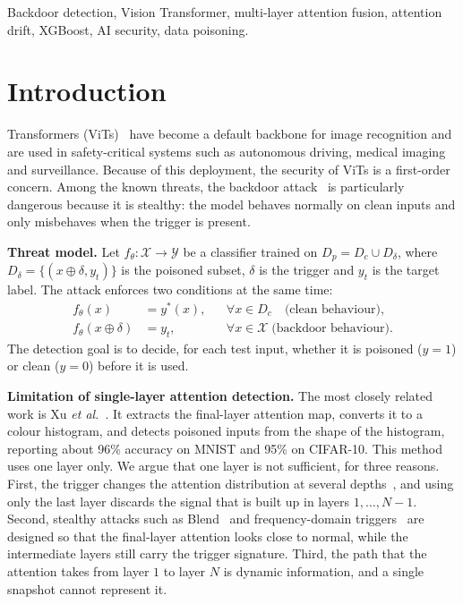 \documentclass[journal]{IEEEtran}
\begin{document}
\begin{IEEEkeywords}
Backdoor detection, Vision Transformer, multi-layer attention fusion, attention
drift, XGBoost, AI security, data poisoning.
\end{IEEEkeywords}

\section{Introduction}

 Transformers (ViTs)~\cite{dosovitskiy2020vit} have
become a default backbone for image recognition and are used in
safety-critical systems such as autonomous driving, medical imaging and
surveillance. Because of this deployment, the security of ViTs is a first-order
concern. Among the known threats, the backdoor attack~\cite{gu2017badnets} is
particularly dangerous because it is stealthy: the model behaves normally on
clean inputs and only misbehaves when the trigger is present.

\textbf{Threat model.} Let $f_\theta:\mathcal{X}\to\mathcal{Y}$ be a classifier
trained on $D_p=D_c\cup D_\delta$, where $D_\delta=\{(x\oplus\delta,y_t)\}$ is
the poisoned subset, $\delta$ is the trigger and $y_t$ is the target label. The
attack enforces two conditions at the same time:
\begin{align}
f_\theta(x)&=y^\ast(x), && \forall x\in D_c \quad\text{(clean behaviour)},\\
f_\theta(x\oplus\delta)&=y_t, && \forall x\in\mathcal{X}\;\text{(backdoor behaviour)}.
\end{align}
The detection goal is to decide, for each test input, whether it is poisoned
($y=1$) or clean ($y=0$) before it is used.

\textbf{Limitation of single-layer attention detection.} The most closely
related work is Xu \emph{et al.}~\cite{xu2025attention}. It extracts the
final-layer attention map, converts it to a colour histogram, and detects
poisoned inputs from the shape of the histogram, reporting about 96\% accuracy
on MNIST and 95\% on CIFAR-10. This method uses one layer only. We argue that
one layer is not sufficient, for three reasons. First, the trigger changes the
attention distribution at several depths~\cite{yuan2023catching}, and using
only the last layer discards the signal that is built up in layers
$1,\dots,N-1$. Second, stealthy attacks such as Blend~\cite{chen2017blend} and
frequency-domain triggers~\cite{barni2019sig} are designed so that the
final-layer attention looks close to normal, while the intermediate layers
still carry the trigger signature. Third, the path that the attention takes
from layer $1$ to layer $N$ is dynamic information, and a single snapshot
cannot represent it.
\end{document}
